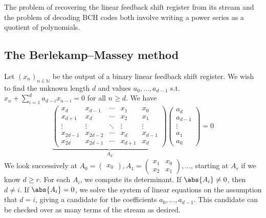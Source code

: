 The problem of recovering the linear feedback shift register from its stream and the problem of decoding BCH codes both involve writing a power series as a quotient of polynomials.

\subsection{The Berlekamp--Massey method}
Let $(x_n)_{n \in \mathbb N}$ be the output of a binary linear feedback shift register.
We wish to find the unknown length $d$ and values $a_0, \dots, a_{d-1}$ s.t. $x_n + \sum_{i=1}^d a_{d-i} x_{n-i} = 0$ for all $n \geq d$.
We have
\begin{align*}
    \underbrace{\begin{pmatrix}
        x_d & x_{d-1} & \cdots & x_1 & x_0 \\
        x_{d+1} & x_d & \cdots & x_2 & x_1 \\
        \vdots & \vdots & \ddots & \vdots & \vdots \\
        x_{2d-1} & x_{2d-2} & \cdots & x_d & x_{d-1} \\
        x_{2d} & x_{2d-1} & \cdots & x_{d+1} & x_d
    \end{pmatrix}}_{A_d} \begin{pmatrix}
        a_d \\
        a_{d-1} \\
        \vdots \\
        a_1 \\
        a_0
    \end{pmatrix} = 0
\end{align*}
We look successively at $A_0 = \begin{pmatrix}
    x_0
\end{pmatrix}, A_1 = \begin{pmatrix}
    x_1 & x_0 \\
    x_2 & x_1
\end{pmatrix}, \dots$, starting at $A_r$ if we know $d \geq r$.
For each $A_i$, we compute its determinant.
If $\abs{A_i} \neq 0$, then $d \neq i$.
If $\abs{A_i} = 0$, we solve the system of linear equations on the assumption that $d = i$, giving a candidate for the coefficients $a_0, \dots, a_{d-1}$.
This candidate can be checked over as many terms of the stream as desired.
